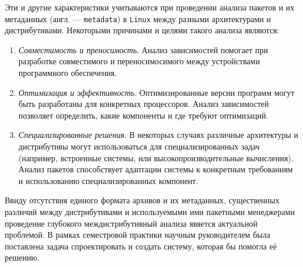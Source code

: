 Эти и другие характеристики учитываются при проведении анализа пакетов и их метаданных (англ. --- \texttt{metadata}) в \texttt{Linux} между разными архитектурами и дистрибутивами.
Некоторыми причинами и целями такого анализа являются:
\begin{enumerate}
	\item \textit{Совместимость и преносимость}. Анализ зависимостей помогает при разработке совместимого и переносимосимого между устройствами программного обеспечения.
	\item \textit{Оптимизация и эффективность}. Оптимизированные версии программ могут быть разработаны для конкретных процессоров. Анализ зависимостей позволяет определить, какие компоненты и где требуют оптимизаций.
	\item \textit{Специализированные решения}. В некоторых случаях различные архитектуры и дистрибутивы могут использоваться для специализированных задач (например, встроенные системы, или высокопроизводительные вычисления). Анализ пакетов способствует адаптации системы к конкретным требованиям и использованию специализированных компонент.
\end{enumerate}

Ввиду отсутствия единого формата архивов и их метаданных, существенных различий между дистрибутивами и используемыми ими пакетными менеджерами проведение глубокого междистрибутивный анализа явяется актуальной проблемой.
В рамках семестровой практики научным руководителем была поставлена задача спроектировать и создать систему, которая бы помогла её решению.
